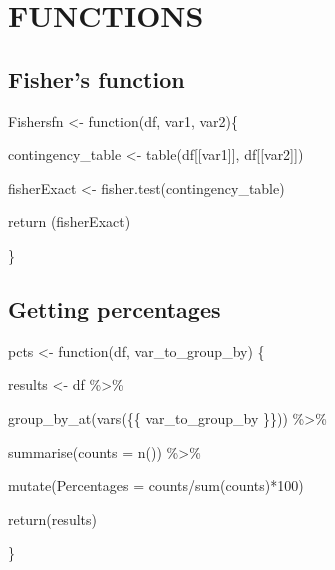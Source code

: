 \documentclass[
]{report}
\newenvironment{Shaded}{\begin{snugshade}}{\end{snugshade}}
\newcommand{\AttributeTok}[1]{\textcolor[rgb]{0.40,0.45,0.13}{#1}}
\newcommand{\ControlFlowTok}[1]{\textcolor[rgb]{0.00,0.23,0.31}{#1}}
\newcommand{\DecValTok}[1]{\textcolor[rgb]{0.68,0.00,0.00}{#1}}
\newcommand{\FunctionTok}[1]{\textcolor[rgb]{0.28,0.35,0.67}{#1}}
\newcommand{\NormalTok}[1]{\textcolor[rgb]{0.00,0.23,0.31}{#1}}
\newcommand{\OtherTok}[1]{\textcolor[rgb]{0.00,0.23,0.31}{#1}}
\newcommand{\SpecialCharTok}[1]{\textcolor[rgb]{0.37,0.37,0.37}{#1}}
\begin{document}
\hypertarget{functions}{%
\chapter{FUNCTIONS}\label{functions}}

\hypertarget{fishers-function}{%
\section{Fisher's function}\label{fishers-function}}

\begin{Shaded}
\begin{Highlighting}[]
\NormalTok{Fishersfn }\OtherTok{\textless{}{-}} \ControlFlowTok{function}\NormalTok{(df, var1, var2)\{}

\NormalTok{  contingency\_table }\OtherTok{\textless{}{-}} \FunctionTok{table}\NormalTok{(df[[var1]], df[[var2]])}

\NormalTok{  fisherExact }\OtherTok{\textless{}{-}} \FunctionTok{fisher.test}\NormalTok{(contingency\_table)}

  \FunctionTok{return}\NormalTok{ (fisherExact)}

\NormalTok{\}}
\end{Highlighting}
\end{Shaded}

\hypertarget{getting-percentages}{%
\section{Getting percentages}\label{getting-percentages}}

\begin{Shaded}
\begin{Highlighting}[]
\NormalTok{pcts }\OtherTok{\textless{}{-}} \ControlFlowTok{function}\NormalTok{(df, var\_to\_group\_by) \{}

\NormalTok{  results }\OtherTok{\textless{}{-}}\NormalTok{ df }\SpecialCharTok{\%\textgreater{}\%}

    \FunctionTok{group\_by\_at}\NormalTok{(}\FunctionTok{vars}\NormalTok{(\{\{ var\_to\_group\_by \}\})) }\SpecialCharTok{\%\textgreater{}\%}

    \FunctionTok{summarise}\NormalTok{(}\AttributeTok{counts =} \FunctionTok{n}\NormalTok{()) }\SpecialCharTok{\%\textgreater{}\%}

    \FunctionTok{mutate}\NormalTok{(}\AttributeTok{Percentages =}\NormalTok{ counts}\SpecialCharTok{/}\FunctionTok{sum}\NormalTok{(counts)}\SpecialCharTok{*}\DecValTok{100}\NormalTok{)}

  

  \FunctionTok{return}\NormalTok{(results)}

\NormalTok{\}}
\end{Highlighting}
\end{Shaded}
\end{document}
